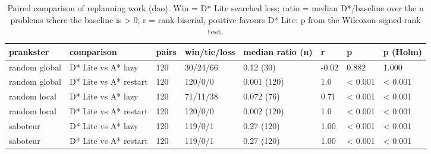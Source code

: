 \begin{table}[t]
\centering
\small
\caption{Paired comparison of replanning work (dao). Win = D* Lite searched less; ratio = median D*/baseline over the n problems where the baseline is > 0; r = rank-biserial, positive favours D* Lite; p from the Wilcoxon signed-rank test.}
\label{tab:tests-replan-dao}
\begin{tabular}{llllllll}
\toprule
prankster & comparison & pairs & win/tie/loss & median ratio (n) & r & p & p (Holm) \\
\midrule
random global & D* Lite vs A* lazy & 120 & 30/24/66 & 0.12 (30) & -0.02 & 0.882 & 1.000 \\
random global & D* Lite vs A* restart & 120 & 120/0/0 & 0.001 (120) & 1.0 & < 0.001 & < 0.001 \\
random local & D* Lite vs A* lazy & 120 & 71/11/38 & 0.072 (76) & 0.71 & < 0.001 & < 0.001 \\
random local & D* Lite vs A* restart & 120 & 120/0/0 & 0.002 (120) & 1.0 & < 0.001 & < 0.001 \\
saboteur & D* Lite vs A* lazy & 120 & 119/0/1 & 0.27 (120) & 1.00 & < 0.001 & < 0.001 \\
saboteur & D* Lite vs A* restart & 120 & 119/0/1 & 0.27 (120) & 1.00 & < 0.001 & < 0.001 \\
\bottomrule
\end{tabular}
\end{table}
